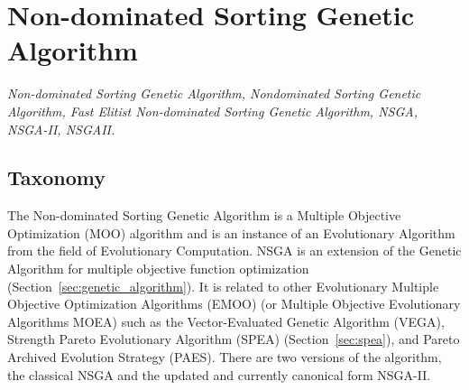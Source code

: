 

\section{Non-dominated Sorting Genetic Algorithm} 
\label{sec:nsga}

\emph{Non-dominated Sorting Genetic Algorithm, Nondominated Sorting Genetic Algorithm, Fast Elitist Non-dominated Sorting Genetic Algorithm, NSGA, NSGA-II, NSGAII.}

\subsection{Taxonomy}
The Non-dominated Sorting Genetic Algorithm is a Multiple Objective Optimization (MOO) algorithm and is an instance of an Evolutionary Algorithm from the field of Evolutionary Computation. 
NSGA is an extension of the Genetic Algorithm for multiple objective function optimization (Section~\ref{sec:genetic_algorithm}).
It is related to other Evolutionary Multiple Objective Optimization Algorithms (EMOO) (or Multiple Objective Evolutionary Algorithms MOEA) such as the Vector-Evaluated Genetic Algorithm (VEGA), Strength Pareto Evolutionary Algorithm (SPEA) (Section~\ref{sec:spea}), and Pareto Archived Evolution Strategy (PAES).
There are two versions of the algorithm, the classical NSGA and the updated and currently canonical form NSGA-II.


